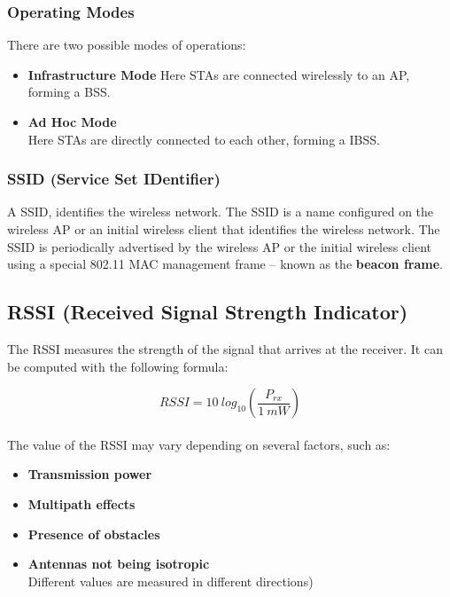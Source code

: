 \documentclass{article}
\begin{document}
\subsubsection{Operating Modes}
There are two possible modes of operations:

\begin{itemize}
	\item \textbf{Infrastructure Mode}
	\vspace{.2cm}
	Here STAs are connected wirelessly to an AP, forming a BSS.
	
	\item \textbf{Ad Hoc Mode}
	\vspace{.2cm} \\
	Here STAs are directly connected to each other, forming a IBSS.
\end{itemize}

\subsubsection{SSID (Service Set IDentifier)}
A SSID, identifies the wireless network. The SSID is a name configured on the wireless AP or an initial wireless client that identifies the wireless network. The SSID is periodically advertised by the wireless AP or the initial wireless client using a special 802.11 MAC management frame -- known as the \textbf{beacon frame}.

\subsection{RSSI (Received Signal Strength Indicator)}
The RSSI measures the strength of the signal that arrives at the receiver. It can be computed with the following formula:

\[ RSSI = 10~log_{10}\left(\frac{P_{rx}}{1~mW}\right) \] \\
The value of the RSSI may vary depending on several factors, such as:

\begin{itemize}
	\item \textbf{Transmission power}
	\item \textbf{Multipath effects}
	\item \textbf{Presence of obstacles}
	\item \textbf{Antennas not being isotropic}
	\vspace{.2cm} \\	
	Different values are measured in different directions)
\end{itemize}
\end{document}
